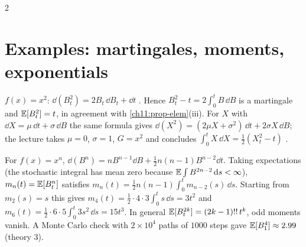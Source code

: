 \begin{paracol}{2}
\section{Examples: martingales, moments, exponentials}\label{ch17:sec-examples}

\begin{example}\label{ch17:ex-square}
$f(x)=x^2$: $\dd(B_t^2)=2B_t\,\dd B_t+\dd t$ . Hence $B_t^2-t=2\int_0^tB\,\dd B$ is a martingale and $\mathbb{E}[B_t^2]=t$, in
agreement with \cref{ch11:prop-elem}(iii). For $X$ with $\dd X=\mu\,\dd t+\sigma\,\dd B$ the same formula gives $\dd(X^2)=(2\mu X+\sigma^2)\,\dd t+2\sigma X\,\dd B$; the lecture takes $\mu=0$, $\sigma=1$, $G=x^2$ and
concludes $\int_0^tX\,\dd X=\tfrac12(X_t^2-t)$ .
\end{example}

\begin{example}\label{ch17:ex-moments}
For $f(x)=x^n$, $\dd(B^n)=nB^{n-1}\dd B+\tfrac12n(n-1)B^{n-2}\dd t$. Taking expectations (the stochastic integral has mean zero because $\mathbb{E}\int B^{2n-2}\,\mathrm{d} s<\infty$),
$m_n(t)=\mathbb{E}[B_t^n]$ satisfies $m_n(t)=\tfrac12n(n-1)\int_0^tm_{n-2}(s)\,\dd s$. Starting from $m_2(s)=s$ this gives $m_4(t)=\tfrac12\cdot4\cdot3\int_0^ts\,\dd s=3t^2$ and $m_6(t)=\tfrac12\cdot6\cdot5\int_0^t3s^2\,\dd s=15t^3$. In general $\mathbb{E}[B_t^{2k}]=(2k-1)!!\,t^k$,
odd moments vanish. A Monte Carlo check with $2\times10^4$ paths of $1000$ steps gave $\mathbb{E}[B_1^4]\approx2.99$ (theory $3$).
\end{example}


\end{paracol}
